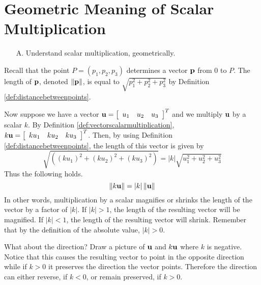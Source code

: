 \section{Geometric Meaning of Scalar Multiplication}

\begin{outcome}

\begin{enumerate}

\item[A.] Understand scalar multiplication, geometrically.

\end{enumerate}
\end{outcome}

Recall that the point $P=\left( p_{1},p_{2},p_{3}\right) $ determines
a vector ${\bf p}$ from $0$ to $P$. The length of ${\bf p}$, denoted $\|
{\bf p} \| $, is equal to $
\sqrt{p_{1}^{2}+p_{2}^{2}+p_{3}^{2}}$ by Definition \ref{def:distancebetweenpoints}.  

Now suppose we have a vector ${\bf u} = \left[ 
\begin{array}{lll}
u_1 &  u_2 & u_3 
\end{array}
\right]^T$ and we multiply ${\bf u}$ by a
scalar $k$. By Definition \ref{def:vectorscalarmultiplication},
$k{\bf u} = \left[
\begin{array}{rrr}
ku_{1} & ku_{2} & ku_{3}
\end{array}
\right]^T $. 
Then, by using Definition \ref{def:distancebetweenpoints}, the length of this vector is given by 
\begin{equation*}
\sqrt{\left( \left( k u_{1}\right) ^{2}+\left( k u_{2}\right)
^{2}+\left( k u_{3}\right) ^{2}\right) }=\left\vert k \right\vert
\sqrt{u_{1}^{2}+u_{2}^{2}+u_{3}^{2}}
\end{equation*}
Thus the following holds.
\begin{equation*}
\| k {\bf u} \| =\left\vert k \right\vert
\| {\bf u} \| 
\end{equation*}
In other words, multiplication by a scalar magnifies or shrinks the length
of the vector by a factor of $\left\vert k \right\vert$. If $\left\vert k \right\vert > 1$, the length of the resulting vector will 
be magnified. If $\left\vert k \right\vert <1$, the length of the resulting vector will shrink. Remember that by the definition 
of the absolute value, $\left\vert k \right\vert >0$. 

What about the direction? Draw a picture of ${\bf u}$ and $k{\bf u}$
where $k$ is negative. Notice that this causes the resulting vector
to point in the opposite direction while if $k >0$ it preserves the
direction the vector points. Therefore the direction can either
reverse, if $k < 0$, or remain preserved, if $k > 0$.

